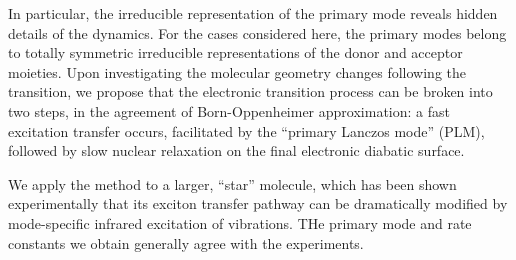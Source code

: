 In particular, the irreducible representation of the primary mode reveals
hidden details of the dynamics. For the cases considered here, the primary modes belong to totally symmetric irreducible representations  of
the donor and acceptor moieties. Upon investigating the molecular geometry changes following  the transition,   we propose that the electronic transition process can be
broken into two steps, in the agreement of Born-Oppenheimer approximation:  a fast excitation transfer occurs, facilitated by the ``primary Lanczos mode'' (PLM),
followed by slow nuclear relaxation on the final electronic diabatic surface.

We apply the method to a larger, ``star'' molecule, which has been shown experimentally that its exciton transfer pathway can be dramatically modified by mode-specific infrared excitation of vibrations. THe primary mode and rate constants we obtain generally agree with the experiments.
\endgroup
\vfill
